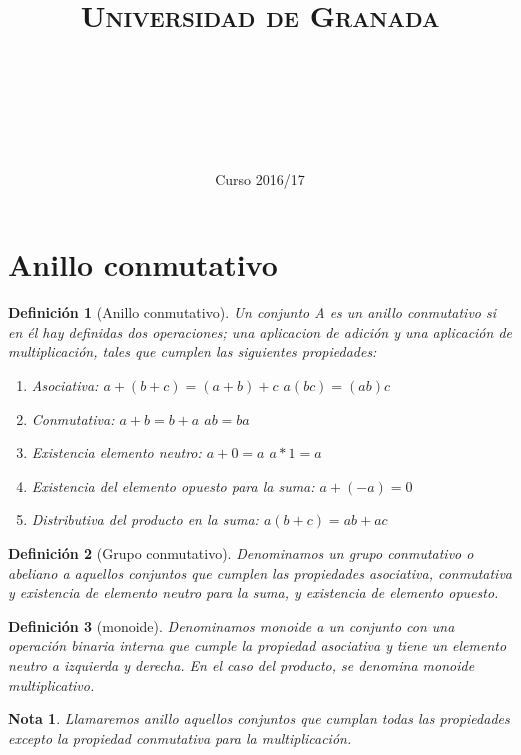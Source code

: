 \documentclass[11pt, a4paper, titlepage]{article}
\title{
  \normalfont \normalsize 
  \textsc{Universidad de Granada} \\ [25pt]    %
  \horrule{0.5pt} \\[0.4cm] %
  \huge \subject\\ %
  \horrule{2pt} \\[0.5cm] %
}
\author{\Large{\docauthor}}
\date{\vspace{-1.5em} \normalsize Curso 2016/17}
\theoremstyle{theorem-style}
\theoremstyle{definition-style}
\newtheorem*{ndef}{Definición}
\theoremstyle{remark-style}
\newtheorem*{nota}{Nota}
\theoremstyle{example-style}
\newenvironment{nlist}
{\begin{enumerate}
\renewcommand\labelenumi{(\emph{\roman{enumi})}}}
{\end{enumerate}}
\begin{document}
\maketitle
\tableofcontents
\newpage

\section{Anillo conmutativo}

\begin{ndef}[Anillo conmutativo]
Un conjunto A es un anillo conmutativo si en él hay definidas dos operaciones; una aplicacion de adición y una aplicación de multiplicación, tales que cumplen las siguientes propiedades:
\begin{nlist}
\item Asociativa: $a+(b+c) = (a+b)+c$\hspace{1cm} $a(bc) = (ab)c$
\item Conmutativa: $a+b = b+a$ \hspace{1cm} $ab = ba$
\item Existencia elemento neutro: $a+0 = a$ \hspace{1cm} $a*1 = a$
\item Existencia del elemento opuesto para la suma: $a+(-a) = 0$
\item Distributiva del producto en la suma: $a(b+c) = ab+ ac$

\end{nlist}

\end{ndef}

\begin{ndef}[Grupo conmutativo]
	Denominamos un grupo conmutativo o abeliano a aquellos conjuntos que cumplen las propiedades asociativa, conmutativa y existencia de elemento neutro para la suma, y existencia de elemento opuesto.
\end{ndef}

\begin{ndef}[monoide]
	Denominamos monoide a un conjunto con una operación binaria interna que cumple la propiedad asociativa y tiene un elemento neutro a izquierda y derecha. En el caso del producto, se denomina monoide multiplicativo.
\end{ndef}

\begin{nota}
	Llamaremos anillo aquellos conjuntos que cumplan todas las propiedades excepto la propiedad conmutativa para la multiplicación.
\end{nota}
\end{document}
